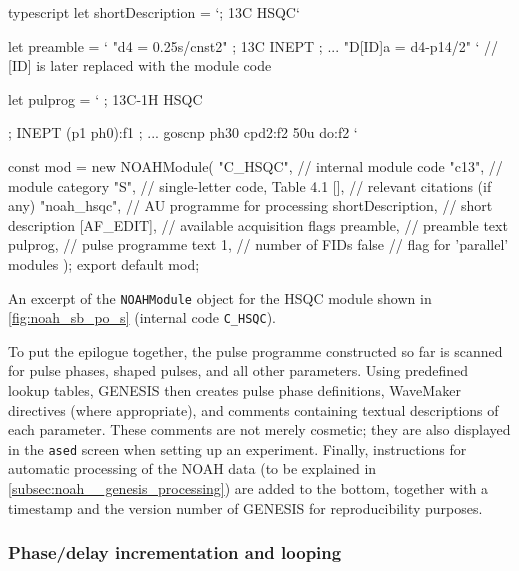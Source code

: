 \begin{mylisting}[!ht] %
\begin{tcbminted}{typescript}
let shortDescription = `; 13C HSQC`

let preamble = `
"d4      = 0.25s/cnst2"                ; 13C INEPT
; ...
"D[ID]a  = d4-p14/2"
`   // [ID] is later replaced with the module code

let pulprog = `
  ; 13C-1H HSQC

  ; INEPT
  (p1 ph0):f1
  ; ...
  goscnp ph30 cpd2:f2
  50u do:f2
`

const mod = new NOAHModule(
    "C_HSQC",           // internal module code
    "c13",              // module category
    "S",                // single-letter code, Table 4.1
    [],                 // relevant citations (if any)
    "noah_hsqc",        // AU programme for processing
    shortDescription,   // short description
    [AF_EDIT],          // available acquisition flags
    preamble,           // preamble text
    pulprog,            // pulse programme text
    1,                  // number of FIDs
    false               // flag for 'parallel' modules
);
export default mod;
\end{tcbminted}
\caption[HSQC \texttt{NOAHModule} object]{An excerpt of the \texttt{NOAHModule} object for the HSQC module shown in \cref{fig:noah_sb_po_s} (internal code \texttt{C\_HSQC}).}
    \label{lst:module_c_hsqc}
\end{mylisting} %

To put the epilogue together, the pulse programme constructed so far is scanned for pulse phases, shaped pulses, and all other parameters.
Using predefined lookup tables, GENESIS then creates pulse phase definitions, WaveMaker directives (where appropriate), and comments containing textual descriptions of each parameter.
These comments are not merely cosmetic; they are also displayed in the \texttt{ased} screen when setting up an experiment.
Finally, instructions for automatic processing of the NOAH data (to be explained in \cref{subsec:noah__genesis_processing}) are added to the bottom, together with a timestamp and the version number of GENESIS for reproducibility purposes.

\subsubsection{Phase/delay incrementation and looping}

